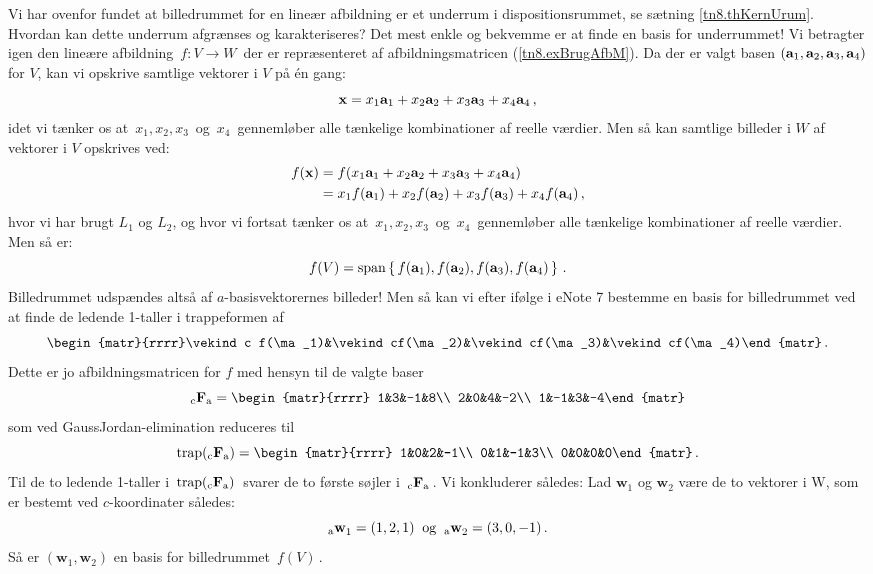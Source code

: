Vi har ovenfor fundet at billedrummet for en lineær afbildning er et underrum i dispositionsrummet, se sætning \ref{tn8.thKernUrum}. Hvordan kan dette underrum afgrænses og karakteriseres? Det mest enkle og bekvemme er at finde en basis for underrummet!\bs
Vi betragter igen den lineære afbildning $\,f:V\rightarrow W\,$ der er repræsenteret af afbildningsmatricen (\ref{tn8.exBrugAfbM}). Da der er valgt basen $(\mathbf{a}_1,\mathbf{a}_2,\mathbf{a}_3,\mathbf{a}_4)$ for $ V $, kan vi opskrive samtlige vektorer i $V$ på én gang:
$$
\mathbf x=x_1\mathbf{a}_1+x_2\mathbf{a}_2+x_3\mathbf{a}_3+x_4\mathbf{a}_4\,,
$$
idet vi tænker os at $\,x_1,x_2,x_3\,$ og $\,x_4\,$ gennemløber alle tænkelige kombinationer af reelle værdier. Men så kan samtlige billeder i $W$ af vektorer i $V$ opskrives ved: 
\begin{align*}
f(\mathbf x)&=f(x_1\mathbf{a}_1+x_2\mathbf{a}_2+x_3\mathbf{a}_3+x_4\mathbf{a}_4)\\
&=x_1f(\mathbf{a}_1)+x_2f(\mathbf{a}_2)+x_3f(\mathbf{a}_3)+x_4f(\mathbf{a}_4)\,,
\end{align*}
hvor vi har brugt $L_1$ og $L_2$, og hvor vi fortsat tænker os at $\,x_1,x_2,x_3\,$ og $\,x_4\,$ gennemløber alle tænkelige kombinationer af reelle værdier. Men så er:
$$f(V)=\mathrm{span}\left\{\,f(\mathbf{a}_1),f(\mathbf{a}_2),f(\mathbf{a}_3),f(\mathbf{a}_4)\,\right\}\,.$$
Billedrummet udspændes altså af $a$-basisvektorernes billeder! Men så kan vi efter ifølge  i eNote 7 bestemme en basis for billedrummet ved at finde de ledende 1-taller i trappeformen af 
$$\begin{matr}{rrrr}\vekind c f(\ma_1)&\vekind cf(\ma_2)&\vekind cf(\ma_3)&\vekind cf(\ma_4)\end{matr}\,.$$
Dette er jo afbildningsmatricen for $f$ med hensyn til de valgte baser
$$\matind cFa=
\begin{matr}{rrrr}
1&3&-1&8\\
2&0&4&-2\\
1&-1&3&-4\end{matr}
$$
som ved GaussJordan-elimination reduceres til
$$
\mathrm{trap}(\matind cFa)=
\begin{matr}{rrrr}
1&0&2&-1\\
0&1&-1&3\\
0&0&0&0\end{matr}\,.
$$
Til de to ledende 1-taller i $\,\mathrm{trap}({_\mathrm{c}\mathbf{F}_\mathrm{a}})\,$ svarer de to første søjler i $\,{_\mathrm{c}\mathbf{F}_\mathrm{a}}\,$. Vi konkluderer således:\bs
Lad  $\mathbf w_1$ og $\mathbf w_2$ være de to vektorer i W, som er bestemt ved $c$-koordinater således:
$${_\mathrm{a}\mathbf{w}}_1=(1,2,1)\mathrm{\;\;og\;\;}{_\mathrm{a}\mathbf{w}}_2=(3,0,-1)\,.$$
Så er $(\mathbf w_1,\mathbf w_2)$ en basis for billedrummet $\,f(V)\,$.

